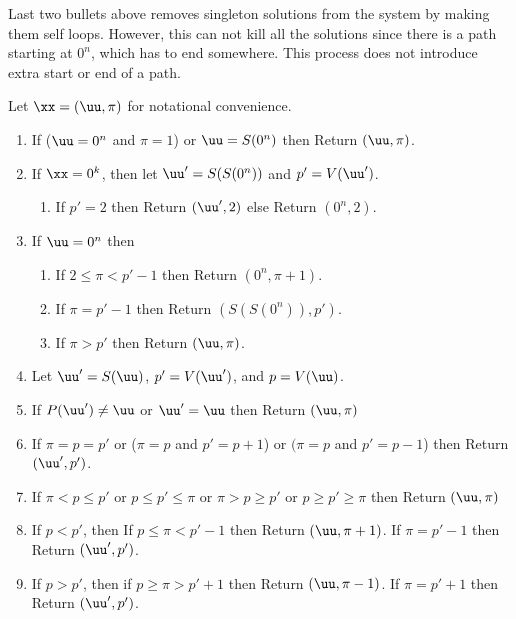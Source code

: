 Last two bullets above removes singleton solutions from the system by making them self loops. However, this can not kill all the solutions since there is a path starting at $0^n$, which has to end somewhere. This process does not introduce extra start or end of a path. 

 Let $\xx=(\uu,\pi)$ for notational convenience.
\begin{enumerate}
\item If ($\uu=0^n$ and $\pi=1$) or $\uu=S(0^n)$ then Return $(\uu,\pi)$. 
\item If $\xx=0^k$, then let $\uu'=S(S(0^n))$ and $p'=V(\uu')$. 
\begin{enumerate}
\item If $p'=2$ then Return $(\uu',2)$ else Return $(0^n,2)$.
\end{enumerate}
\item If $\uu=0^n$ then
\begin{enumerate}
\item If $2\le \pi<p'-1$ then Return $(0^n,\pi+1)$.
\item If $\pi=p'-1$ then Return $(S(S(0^n)),p')$.
\item If $\pi>p'$ then Return $(\uu,\pi)$.
\end{enumerate}
\item Let $\uu'=S(\uu)$, $p'=V(\uu')$, and $p=V(\uu)$. 
\item If $P(\uu')\neq \uu$ or $\uu'=\uu$ then Return $(\uu,\pi)$
\item If $\pi=p=p'$ or ($\pi=p$ and $p'=p+1$) or $(\pi=p$ and $p'=p-1$) then Return $(\uu',p')$.
\item If $\pi<p\le p'$ or $p\le p'\le \pi$ or $\pi>p\ge p'$ or $p\ge p'\ge \pi$ then Return $(\uu,\pi)$
\item If $p<p'$, then If $p\le \pi<p'-1$ then Return $(\uu,\pi+1)$. If $\pi=p'-1$ then Return $(\uu',p')$.
\item If $p>p'$, then if $p \ge \pi>p'+1$ then Return $(\uu,\pi-1)$. If $\pi=p'+1$ then Return $(\uu',p')$.
\end{enumerate}

